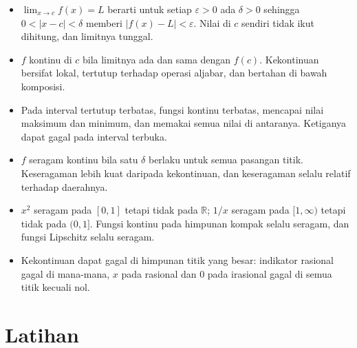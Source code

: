 \begin{ringkasan}
\begin{itemize}
  \item $\lim_{x\to c}f(x)=L$ berarti untuk setiap $\varepsilon>0$ ada $\delta>0$
        sehingga $0<|x-c|<\delta$ memberi $|f(x)-L|<\varepsilon$. Nilai di $c$
        sendiri tidak ikut dihitung, dan limitnya tunggal.
  \item $f$ kontinu di $c$ bila limitnya ada dan sama dengan $f(c)$. Kekontinuan
        bersifat lokal, tertutup terhadap operasi aljabar, dan bertahan di bawah
        komposisi.
  \item Pada interval tertutup terbatas, fungsi kontinu terbatas, mencapai nilai
        maksimum dan minimum, dan memakai semua nilai di antaranya. Ketiganya dapat
        gagal pada interval terbuka.
  \item $f$ seragam kontinu bila satu $\delta$ berlaku untuk semua pasangan titik.
        Keseragaman lebih kuat daripada kekontinuan, dan keseragaman selalu relatif
        terhadap daerahnya.
  \item $x^{2}$ seragam pada $[0,1]$ tetapi tidak pada $\mathbb{R}$; $1/x$ seragam
        pada $[1,\infty)$ tetapi tidak pada $(0,1]$. Fungsi kontinu pada himpunan
        kompak selalu seragam, dan fungsi Lipschitz selalu seragam.
  \item Kekontinuan dapat gagal di himpunan titik yang besar: indikator rasional gagal
        di mana-mana, $x$ pada rasional dan $0$ pada irasional gagal di semua titik
        kecuali nol.
\end{itemize}
\end{ringkasan}

\section{Latihan}

